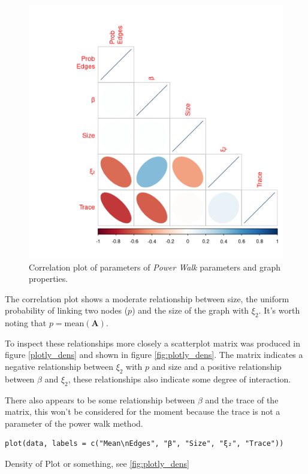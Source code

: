 \documentclass[11pt]{article}
\begin{document}
\begin{figure}[htbp]
\centering
\includegraphics[width=12cm]{media/corrplot.png}
\caption{\label{fig:corrplot}Correlation plot of parameters of \emph{Power Walk} parameters and graph properties.}
\end{figure}

The correlation plot shows a moderate relationship between size, the uniform probability of linking two nodes (\(p\)) and the size of the graph with \(\xi_{2}\). It's worth noting that \(p = \mathrm{mean}\left(\mathbf{A}\right)\).

To inspect these relationships more closely a scatterplot matrix was produced in
figure \ref{plotly_dens} and shown in figure \ref{fig:plotly_dens}. The matrix indicates a
negative relationship between \(\xi_{2}\) with \(p\) and size and a positive
relationship between \(\beta\) and \(\xi_{2}\), these relationships also indicate some degree of interaction.


There also appears to be some relationship between \(\beta\) and the trace of the matrix, this won't be considered for the moment because the trace is not a parameter of the power walk method.

\begin{listing}[htbp]
\begin{verbatim}
plot(data, labels = c("Mean\nEdges", "β", "Size", "ξ₂", "Trace"))
\end{verbatim}
\caption{\label{plotly_dens}Density of Plot or something, see \ref{fig:plotly_dens}}
\end{listing}
\end{document}
